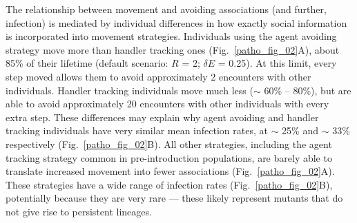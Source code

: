 The relationship between movement and avoiding associations (and further, infection) is mediated by individual differences in how exactly social information is incorporated into movement strategies.
Individuals using the agent avoiding strategy move more than handler tracking ones (Fig.~\ref{patho_fig_02}A), about 85\% of their lifetime (default scenario: $R$ = 2; $\delta E$ = 0.25).
At this limit, every step moved allows them to avoid approximately 2 encounters with other individuals.
Handler tracking individuals move much less ($\sim$ 60\% -- 80\%), but are able to avoid approximately 20 encounters with other individuals with every extra step.
These differences may explain why agent avoiding and handler tracking individuals have very similar mean infection rates, at $\sim$ 25\% and $\sim$ 33\% respectively (Fig.~\ref{patho_fig_02}B).
All other strategies, including the agent tracking strategy common in pre-introduction populations, are barely able to translate increased movement into fewer associations (Fig.~\ref{patho_fig_02}A).
These strategies have a wide range of infection rates (Fig.~\ref{patho_fig_02}B), potentially because they are very rare --- these likely represent mutants that do not give rise to persistent lineages.


